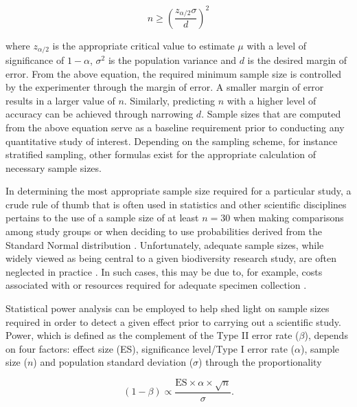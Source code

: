\begin{equation}
n \geq \left(\frac{z_{\alpha/2}\sigma}{d}\right)^2
\end{equation}

\vspace{5mm}

\noindent where $z_{\alpha/2}$ is the appropriate critical value to estimate $\mu$ with a level of significance of $1 - \alpha$, $\sigma^2$ is the population variance and $d$ is the desired margin of error. From the above equation, the required minimum sample size is controlled by the experimenter through the margin of error. A smaller margin of error results in a larger value of $n$. Similarly, predicting $n$ with a higher level of accuracy can be achieved through narrowing $d$. Sample sizes that are computed from the above equation serve as a baseline requirement prior to conducting any quantitative study of interest. Depending on the sampling scheme, for instance stratified sampling, other formulas exist for the appropriate calculation of necessary sample sizes.

\vspace{5mm}

In determining the most appropriate sample size required for a particular study, a crude rule of thumb that is often used in statistics and other scientific disciplines pertains to the use of a sample size of at least $n = 30$ when making comparisons among study groups or when deciding to use probabilities derived from the Standard Normal distribution \cite{cohen1990things}. Unfortunately, adequate sample sizes, while widely viewed as being central to a given biodiversity research study, are often neglected in practice \cite{lenth2001some}. In such cases, this may be due to, for example, costs associated with or resources required for adequate specimen collection \cite{cameron2006will, hortal2005ed, muirhead2008identifying}.

\vspace{5mm}

Statistical power analysis can be employed to help shed light on sample sizes required in order to detect a given effect prior to carrying out a scientific study. Power, which is defined as the complement of the Type II error rate ($\beta$), depends on four factors: effect size (ES), significance level/Type I error rate ($\alpha$), sample size ($n$) and population standard deviation ($\sigma$) through the proportionality \cite{di2003much}

\begin{equation}
(1 - \beta) \propto \frac{\textrm{ES} \times \alpha \times \sqrt{n}}{\sigma}.
\end{equation}

